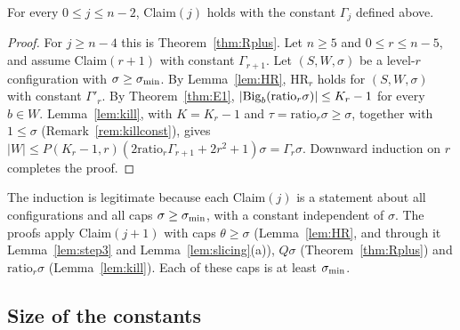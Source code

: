 \begin{theorem}\label{thm:allclaims}
For every $0\le j\le n-2$, Claim$(j)$ holds with the constant $\Gamma_j$ defined above.
\end{theorem}
\begin{proof}
For $j\ge n-4$ this is Theorem~\ref{thm:Rplus}. Let $n\ge5$ and $0\le r\le n-5$, and assume Claim$(r+1)$ with constant
$\Gamma_{r+1}$. Let $(S,W,\sigma)$ be a level-$r$ configuration with $\sigma\ge\sigma_{\min}$. By Lemma~\ref{lem:HR}, HR$_r$ holds for
$(S,W,\sigma)$ with constant $\Gamma'_r$. By Theorem~\ref{thm:E1}, $|\mathrm{Big}_b({\mathrm{ratio}}_r\sigma)|\le K_r-1$ for every
$b\in W$. Lemma~\ref{lem:kill}, with $K=K_r-1$ and $\tau={\mathrm{ratio}}_r\sigma\ge\sigma$, together with $1\le\sigma$
(Remark~\ref{rem:killconst}), gives $|W|\le P(K_r-1,r)(2{\mathrm{ratio}}_r\Gamma_{r+1}+2r^2+1)\sigma=\Gamma_r\sigma$. Downward
induction on $r$ completes the proof.
\end{proof}

The induction is legitimate because each Claim$(j)$ is a statement about all configurations and all caps
$\sigma\ge\sigma_{\min}$, with a constant independent of $\sigma$. The proofs apply Claim$(j+1)$ with caps
$\theta\ge\sigma$ (Lemma~\ref{lem:HR}, and through it Lemma~\ref{lem:step3} and Lemma~\ref{lem:slicing}(a)), $Q\sigma$
(Theorem~\ref{thm:Rplus}) and ${\mathrm{ratio}}_r\sigma$ (Lemma~\ref{lem:kill}). Each of these caps is at least $\sigma_{\min}$.

\subsection{Size of the constants}

